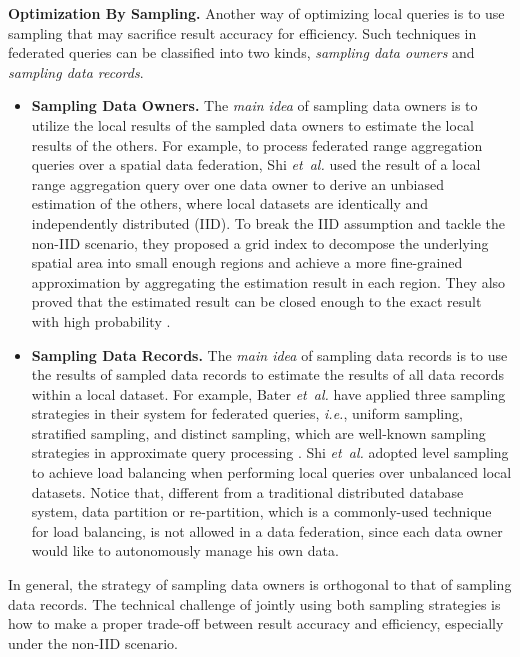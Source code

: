 \documentclass[11pt]{article}
\newcommand{\etal}{\textit{et~al.}\xspace}
\newcommand{\ie}{\textit{i.e.},\xspace}
\newcommand{\fakeparagraph}[1]{\vspace{1mm}\noindent\textbf{#1.}}
\begin{document}
\fakeparagraph{Optimization By Sampling}
Another way of optimizing local queries is to use sampling that may sacrifice result accuracy for efficiency.
Such techniques in federated queries can be classified into two kinds, \textit{sampling data owners} and \textit{sampling data records}.
\begin{itemize}
	\item \textbf{Sampling Data Owners.}
	The \textit{main idea} of sampling data owners is to utilize the local results of the sampled data owners to estimate the local results of the others.
	For example, to process federated range aggregation queries over a spatial data federation, Shi \etal \cite{Yongxin-ref_shi2021efficient} used the result of a local range aggregation query over one data owner to derive an unbiased estimation of the others, where local datasets are identically and independently distributed (IID).
	To break the IID assumption and tackle the non-IID scenario, they proposed a grid index to decompose the underlying spatial area into small enough regions and achieve a more fine-grained approximation by aggregating the estimation result in each region.
	They also proved that the estimated result can be closed enough to the exact result with high probability \cite{Yongxin-ref_shi2021efficient}.
	
	\item \textbf{Sampling Data Records.}
	The \textit{main idea} of sampling data records is to use the results of sampled data records to estimate the results of all data records within a local dataset.
	For example, Bater \etal \cite{Yongxin-ref_bater2020saqe} have applied three sampling strategies in their system for \SAQE federated queries, \ie uniform sampling, stratified sampling, and distinct sampling, which are well-known sampling strategies in approximate query processing \cite{Yongxin-DBLP:conf/sigmod/ChaudhuriDK17}.
	Shi \etal \cite{Yongxin-ref_shi2021efficient} adopted level sampling to achieve load balancing when performing local queries over unbalanced local datasets. Notice that, different from a traditional distributed database system,
	data partition or re-partition, which is a commonly-used technique for load balancing, is not allowed in a data federation, since each data owner would like to autonomously manage his own data.
\end{itemize}

In general, the strategy of sampling data owners is orthogonal to that of sampling data records.
The technical challenge of jointly using both sampling strategies is how to make a proper trade-off between result accuracy and efficiency, especially under the non-IID scenario.
\end{document}
